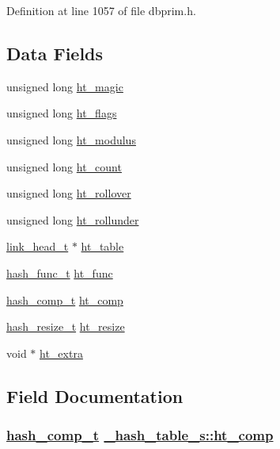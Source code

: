 Definition at line 1057 of file dbprim.h.\subsection*{Data Fields}
\begin{CompactItemize}
\item 
unsigned long \hyperlink{struct__hash__table__s_o0}{ht\_\-magic}
\item 
unsigned long \hyperlink{struct__hash__table__s_o1}{ht\_\-flags}
\item 
unsigned long \hyperlink{struct__hash__table__s_o2}{ht\_\-modulus}
\item 
unsigned long \hyperlink{struct__hash__table__s_o3}{ht\_\-count}
\item 
unsigned long \hyperlink{struct__hash__table__s_o4}{ht\_\-rollover}
\item 
unsigned long \hyperlink{struct__hash__table__s_o5}{ht\_\-rollunder}
\item 
\hyperlink{struct__link__head__s}{link\_\-head\_\-t} $\ast$ \hyperlink{struct__hash__table__s_o6}{ht\_\-table}
\item 
\hyperlink{group__dbprim__hash_ga4}{hash\_\-func\_\-t} \hyperlink{struct__hash__table__s_o7}{ht\_\-func}
\item 
\hyperlink{group__dbprim__hash_ga5}{hash\_\-comp\_\-t} \hyperlink{struct__hash__table__s_o8}{ht\_\-comp}
\item 
\hyperlink{group__dbprim__hash_ga6}{hash\_\-resize\_\-t} \hyperlink{struct__hash__table__s_o9}{ht\_\-resize}
\item 
void $\ast$ \hyperlink{struct__hash__table__s_o10}{ht\_\-extra}
\end{CompactItemize}


\subsection{Field Documentation}
\hypertarget{struct__hash__table__s_o8}{
\subsubsection[ht\_\-comp]{\setlength{\rightskip}{0pt plus 5cm}\hyperlink{group__dbprim__hash_ga5}{hash\_\-comp\_\-t} \hyperlink{struct__hash__table__s_o8}{\_\-hash\_\-table\_\-s::ht\_\-comp}}}
\label{struct__hash__table__s_o8}


